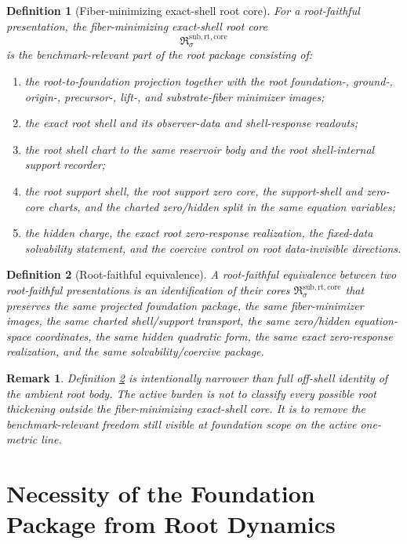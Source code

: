 \documentclass[11pt]{article}
\newcommand{\RootCore}{\mathfrak R^{\mathrm{sub,rt,core}}}
\newtheorem{definition}{Definition}
\newtheorem{remark}{Remark}
\begin{document}
\begin{definition}[Fiber-minimizing exact-shell root core]
\label{def:core}
For a root-faithful presentation, the \emph{fiber-minimizing exact-shell root core}
\[
\RootCore_{\sigma}
\]
is the benchmark-relevant part of the root package consisting of:
\begin{enumerate}
    \item the root-to-foundation projection together with the root foundation-, ground-, origin-, precursor-, lift-, and substrate-fiber minimizer images;
    \item the exact root shell and its observer-data and shell-response readouts;
    \item the root shell chart to the same reservoir body and the root shell-internal support recorder;
    \item the root support shell, the root support zero core, the support-shell and zero-core charts, and the charted zero/hidden split in the same equation variables;
    \item the hidden charge, the exact root zero-response realization, the fixed-data solvability statement, and the coercive control on root data-invisible directions.
\end{enumerate}
\end{definition}

\begin{definition}[Root-faithful equivalence]
\label{def:equiv}
A \emph{root-faithful equivalence} between two root-faithful presentations is an identification of their cores \(\RootCore_{\sigma}\) that preserves the same projected foundation package, the same fiber-minimizer images, the same charted shell/support transport, the same zero/hidden equation-space coordinates, the same hidden quadratic form, the same exact zero-response realization, and the same solvability/coercive package.
\end{definition}

\begin{remark}
Definition \ref{def:equiv} is intentionally narrower than full off-shell identity of the ambient root body. The active burden is not to classify every possible root thickening outside the fiber-minimizing exact-shell core. It is to remove the benchmark-relevant freedom still visible at foundation scope on the active one-metric line.
\end{remark}

\section{Necessity of the Foundation Package from Root Dynamics}
\end{document}

